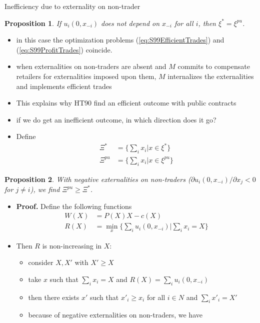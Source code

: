 \documentclass[11pt,english]{beamer}
\newcommand{\dif}{\partial}
\newtheorem{proposition}{Proposition}
\begin{document}
\begin{frame}[allowframebreaks]{Inefficiency due to externality on non-trader}
\begin{proposition}
    If $u_i(0,x_{-i})$ does not depend on $x_{-i}$ for all $i$, then
    $\xi^* =\xi^{pu}$.
  \end{proposition}
  \begin{itemize}
  \item in this case the optimization problems
    (\ref{eq:S99EfficientTrades}) and (\ref{eq:S99ProfitTrades}) coincide.
  \item when externalities on non-traders are absent and $M$ commits
    to compensate retailers for externalities imposed upon them, $M$
    internalizes the externalities and implements efficient trades
  \item This explains why HT90 find an efficient outcome with public contracts
  \item if we do get an inefficient outcome, in which direction does
    it go?
  \item Define
    \begin{align}
      \Xi^* &= \{ \sum_i x_i |x \in \xi^* \} \\
      \Xi^{pu} &= \{ \sum_i x_i |x \in \xi^{pu} \}
    \end{align}
  \end{itemize}
  \begin{proposition} \label{propos:S99PuVsStar}
    With negative externalities on non-traders ($\dif
    u_i(0,x_{-i})/\dif x_j <0$ for $j \neq i$), we find $\Xi^{pu} \geq \Xi^*$.
  \end{proposition}
  \begin{itemize}
  \item \textbf{Proof.} Define the following functions
    \begin{align}
      \label{eq:S99W}
      W(X) &= P(X)X-c(X) \\
      \label{eq:S99R}
      R(X) &= \min_x \{\sum_i u_i(0,x_{-i}) | \sum_i x_i = X \}
    \end{align}
  \item Then $R$ is non-increasing in $X$:
    \begin{itemize}
    \item consider $X,X'$ with $X' \geq X$
    \item take $x$ such that $\sum_i x_i = X$ and $R(X) = \sum_i u_i(0,x_{-i})$
    \item then there exists $x'$ such that $x'_i \geq x_i$ for all $i
      \in N$ and $\sum_i x'_i =X'$
    \item because of negative externalities on non-traders, we have
      \begin{equation*}

\end{equation*}
\end{itemize}
\end{itemize}
\end{frame}
\end{document}
